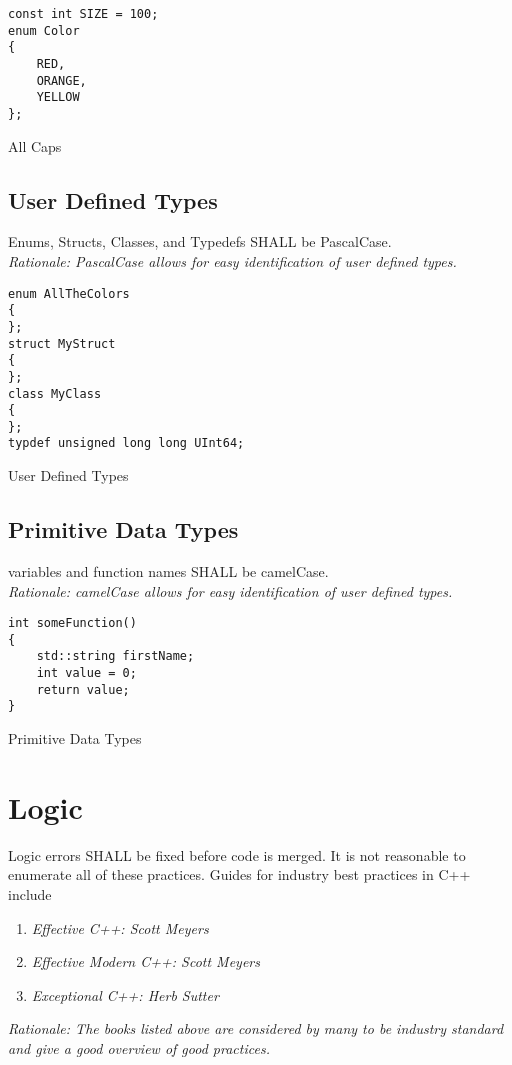 \documentclass{article}
\begin{document}
\begin{listing}[ht]
\begin{verbatim}
const int SIZE = 100;
enum Color
{
    RED,
    ORANGE,
    YELLOW
};
\end{verbatim}
\caption{All Caps}
\end{listing}

\subsection{User Defined Types}
\noindent Enums, Structs, Classes, and Typedefs SHALL be PascalCase. \\
\textit{Rationale: PascalCase allows for easy identification of user defined types.} \\

\begin{listing}[ht]
\begin{verbatim}
enum AllTheColors
{
};
struct MyStruct
{
};
class MyClass
{
};
typdef unsigned long long UInt64;
\end{verbatim}
\caption{User Defined Types}
\end{listing}

\newpage\subsection{Primitive Data Types}
\noindent variables and function names SHALL be camelCase. \\
\textit{Rationale: camelCase allows for easy identification of user defined types.} \\

\begin{listing}[ht]
\begin{verbatim}
int someFunction()
{
    std::string firstName;
    int value = 0;
    return value;
}

\end{verbatim}
\caption{Primitive Data Types}
\end{listing}

\section{Logic}
Logic errors SHALL be fixed before code is merged. It is not reasonable to enumerate all of these practices. Guides for industry best practices in C++ include \\
\begin{enumerate}
    \item \textit{Effective C++: Scott Meyers}
    \item \textit{Effective Modern C++: Scott Meyers}
    \item \textit{Exceptional C++: Herb Sutter}
\end{enumerate}
\textit{Rationale: The books listed above are considered by many to be industry standard and give a good overview of good practices.}
\end{document}
